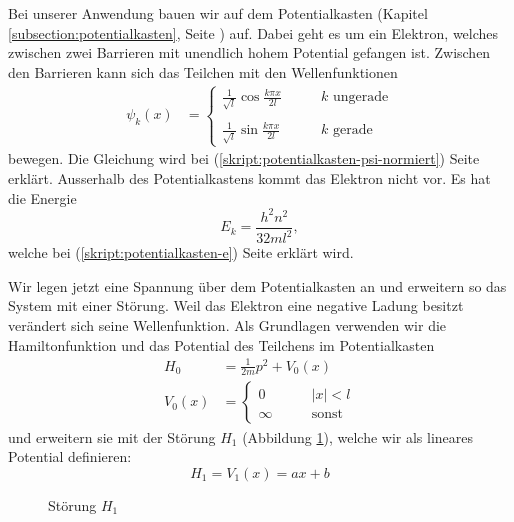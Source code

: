 \begin{refsection}
Bei unserer Anwendung bauen wir auf dem Potentialkasten (Kapitel \ref{subsection:potentialkasten}, Seite \pageref{subsection:potentialkasten}) auf.
Dabei geht es um ein Elektron, welches zwischen zwei Barrieren mit unendlich hohem Potential gefangen ist.
Zwischen den Barrieren kann sich das Teilchen mit den Wellenfunktionen
\begin{align}
\psi_k(x)
&=
\begin{cases}
\displaystyle
\frac{1}{\sqrt{l}}\cos\frac{k \pi x}{2l}&\qquad \text{$k$ ungerade}\\
\\
\displaystyle
\frac{1}{\sqrt{l}}\sin\frac{k \pi x}{2l}&\qquad \text{$k$ gerade}
\end{cases}
\end{align}
bewegen.
Die Gleichung wird bei (\ref{skript:potentialkasten-psi-normiert}) Seite \pageref{skript:potentialkasten-psi-normiert} erkl\"art.
Ausserhalb des Potentialkastens kommt das Elektron nicht vor.
Es hat die Energie
\[
E_k = \frac{h^2n^2}{32ml^2},
\]
welche bei (\ref{skript:potentialkasten-e})
Seite \pageref{skript:potentialkasten-e} erkl\"art wird.

Wir legen jetzt eine Spannung \"uber dem Potentialkasten an
und erweitern so das System mit einer St\"orung.
Weil das Elektron eine negative Ladung besitzt ver\"andert sich seine Wellenfunktion.
Als Grundlagen verwenden wir die Hamiltonfunktion und das Potential des Teilchens im Potentialkasten
\begin{equation}
\begin{aligned}
H_0&=\frac1{2m}p^2+V_0(x)
\\
V_0(x)&=
  \begin{cases}
    0       & \qquad |x|<l\\
    \infty  & \qquad\text{sonst}
  \end{cases}
\end{aligned}
\end{equation}
und erweitern sie mit der St\"orung $H_1$ (Abbildung \ref{abb:efeld_H_1}), welche wir als lineares 
Potential definieren:
\begin{equation}
	\label{eq:efeld_H_1}
  H_1 = V_1(x) = a x + b
\end{equation}

\begin{figure}
  \centering
{}
 \caption{St\"orung $H_1$}
 \label{abb:efeld_H_1}
\end{figure}


\end{refsection}
